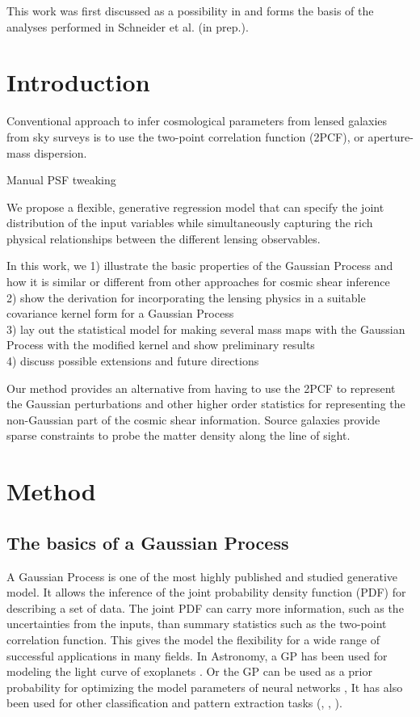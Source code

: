  
This work was first discussed as a possibility in  \citep{Schneider2014}  and 
forms the basis of the analyses performed in Schneider et al. (in prep.).

\section{Introduction} 
Conventional approach to infer cosmological parameters from lensed galaxies
from sky surveys is to use the 
two-point correlation function (2PCF), or aperture-mass dispersion.


Manual PSF tweaking 


We propose a flexible, generative regression model    
that can specify the joint distribution of the input variables while 
simultaneously capturing the rich physical relationships between the different
lensing observables.  

In this work, we 
1) illustrate the basic properties of the Gaussian Process and how it is
similar or different from other approaches for cosmic shear inference  \\ 
2) show the derivation for incorporating the lensing physics in 
a suitable covariance kernel form for a Gaussian Process  \\
3) lay out the statistical model for making several mass maps 
with the Gaussian Process with the modified kernel and show preliminary results \\ 
4) discuss possible extensions and future directions 
 
Our method provides an alternative from having to use the 2PCF to represent the
Gaussian perturbations and other higher order
statistics for representing the non-Gaussian part of the cosmic shear information. 
Source galaxies provide sparse constraints to probe the matter density along
the line of sight. 

\section{Method}
\subsection{The basics of a Gaussian Process}
A Gaussian Process is one of the most highly published and studied 
generative model. It allows the inference of the joint probability density 
function (PDF) for describing a set of data. The joint PDF can carry more information,
such as the uncertainties from the inputs, 
than summary statistics such as the two-point correlation function.
This gives the model the flexibility for a wide range
of successful applications in many fields. 
In Astronomy, a GP has been used for modeling 
the light curve of exoplanets \citep{Ambikasaran2014a}.
Or the GP can be used as a prior probability 
for optimizing the model parameters of
neural networks \citep{Snoek2012}, 
It has also been used for other classification and pattern extraction tasks 
(\citealt{Wilson2013}, \citealt{Duvenaud2013}, \citealt{Rasmussen2006}).
 
